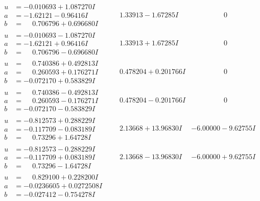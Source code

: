 \documentclass[1p]{elsarticle_modified}
\theoremstyle{definition}
\begin{document}
$$\begin{array}{c|c|c}
\begin{aligned}
u &= -0.010693 + 1.087270 I \\
a &= -1.62121 - 0.96416 I \\
b &= \phantom{-}0.706796 + 0.696680 I\end{aligned}
 & \phantom{-}1.33913 - 1.67285 I & \phantom{-0.000000 } 0 \\ \hline\begin{aligned}
u &= -0.010693 - 1.087270 I \\
a &= -1.62121 + 0.96416 I \\
b &= \phantom{-}0.706796 - 0.696680 I\end{aligned}
 & \phantom{-}1.33913 + 1.67285 I & \phantom{-0.000000 } 0 \\ \hline\begin{aligned}
u &= \phantom{-}0.740386 + 0.492813 I \\
a &= \phantom{-}0.260593 + 0.176271 I \\
b &= -0.072170 + 0.583829 I\end{aligned}
 & \phantom{-}0.478204 + 0.201766 I & \phantom{-0.000000 } 0 \\ \hline\begin{aligned}
u &= \phantom{-}0.740386 - 0.492813 I \\
a &= \phantom{-}0.260593 - 0.176271 I \\
b &= -0.072170 - 0.583829 I\end{aligned}
 & \phantom{-}0.478204 - 0.201766 I & \phantom{-0.000000 } 0 \\ \hline\begin{aligned}
u &= -0.812573 + 0.288229 I \\
a &= -0.117709 - 0.083189 I \\
b &= \phantom{-}0.73296 + 1.64728 I\end{aligned}
 & \phantom{-}2.13668 + 13.96830 I & -6.00000 - 9.62755 I \\ \hline\begin{aligned}
u &= -0.812573 - 0.288229 I \\
a &= -0.117709 + 0.083189 I \\
b &= \phantom{-}0.73296 - 1.64728 I\end{aligned}
 & \phantom{-}2.13668 - 13.96830 I & -6.00000 + 9.62755 I \\ \hline\begin{aligned}
u &= \phantom{-}0.829100 + 0.228200 I \\
a &= -0.0236605 + 0.0272508 I \\
b &= -0.027412 - 0.754278 I\end{aligned}

\end{array}$$
\end{document}
